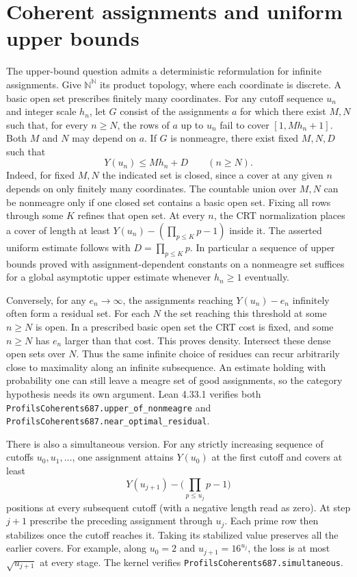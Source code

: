 \documentclass[11pt]{article}
\begin{document}
\section*{Coherent assignments and uniform upper bounds}
The upper-bound question admits a deterministic reformulation for
infinite assignments. Give $\mathbb N^{\mathbb N}$ its product topology,
where each coordinate is discrete. A basic open set prescribes finitely
many coordinates. For any cutoff sequence $u_n$ and integer scale $h_n$,
let $G$ consist of the assignments $a$ for which there exist $M,N$ such
that, for every $n\ge N$, the rows of $a$ up to $u_n$ fail to cover
$[1,Mh_n+1]$. Both $M$ and $N$ may depend on $a$. If $G$ is nonmeagre,
there exist fixed $M,N,D$ such that
\[
                      Y(u_n)\le M h_n+D\qquad(n\ge N).
\]
Indeed, for fixed $M,N$ the indicated set is closed, since a cover at
any given $n$ depends on only finitely many coordinates. The countable
union over $M,N$ can be nonmeagre only if one closed set contains a
basic open set. Fixing all rows through some $K$ refines that open set.
At every $n$, the CRT normalization places a cover of length at least
$Y(u_n)-(\prod_{p\le K}p-1)$ inside it. The asserted uniform estimate
follows with $D=\prod_{p\le K}p$. In particular a sequence of upper
bounds proved with assignment-dependent constants on a nonmeagre set
suffices for a global asymptotic upper estimate whenever $h_n\ge1$
eventually.

Conversely, for any $e_n\to\infty$, the assignments reaching
$Y(u_n)-e_n$ infinitely often form a residual set. For each $N$ the
set reaching this threshold at some $n\ge N$ is open. In a prescribed
basic open set the CRT cost is fixed, and some $n\ge N$ has $e_n$ larger
than that cost. This proves density. Intersect these dense open sets
over $N$. Thus the same infinite choice of residues can recur
arbitrarily close to maximality along an infinite subsequence.
An estimate holding with probability one can still leave a meagre
set of good assignments, so the category hypothesis needs its own
argument.
Lean 4.33.1 verifies both \texttt{ProfilsCoherents687.upper\_of\_nonmeagre}
and \texttt{ProfilsCoherents687.near\_optimal\_residual}.

There is also a simultaneous version. For any strictly increasing
sequence of cutoffs $u_0,u_1,\ldots$, one assignment attains $Y(u_0)$
at the first cutoff and covers at least
\[
       Y(u_{j+1})-\Big(\prod_{p\le u_j}p-1\Big)
\]
positions at every subsequent cutoff (with a negative length read as
zero). At step $j+1$ prescribe the preceding assignment through $u_j$.
Each prime row then stabilizes once the cutoff reaches it. Taking its
stabilized value preserves all the earlier covers. For example, along
$u_0=2$ and $u_{j+1}=16^{u_j}$, the loss is at most $\sqrt{u_{j+1}}$ at
every stage. The kernel verifies \texttt{ProfilsCoherents687.simultaneous}.
\end{document}
